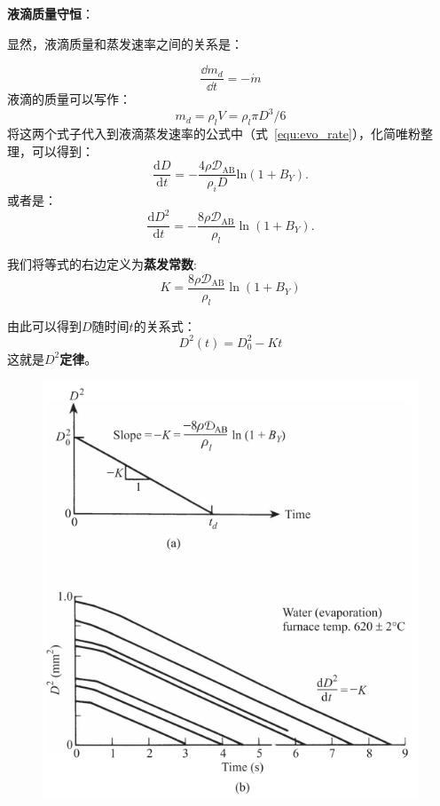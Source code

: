\textbf{液滴质量守恒}：

显然，液滴质量和蒸发速率之间的关系是：

\begin{equation}
    \frac{\dd m_d}{\dd t}=-\dot{m}
\end{equation}
液滴的质量可以写作：
\begin{equation}
    m_d = \rho_l V = \rho_l \pi D^3/6
\end{equation}
将这两个式子代入到液滴蒸发速率的公式中（式~\ref{equ:evo_rate}），化简唯粉整理，可以得到：
\begin{equation}
    \frac{\mathrm{d}D}{\mathrm{d}t}=-\frac{4\rho \mathcal{D}_\mathrm{AB}}{\rho_{i}D}\mathrm{ln}(1+B_{Y}).
\end{equation}
或者是：
\begin{equation}\label{equ:03_evap}
    {\frac{\mathrm{d}D^{2}}{\mathrm{d}t}}=-{\frac{8\rho \mathcal{D}_{\mathrm{AB}}}{\rho_{l}}}\ln(1+B_{Y}).
\end{equation}

我们将等式的右边定义为\textbf{蒸发常数}:
\begin{equation}
    K = {\frac{8\rho \mathcal{D}_{\mathrm{AB}}}{\rho_{l}}}\ln(1+B_{Y})
\end{equation}

由此可以得到\(D\)随时间\(t\)的关系式：
\begin{equation}
    D^2(t)=D_0^2 - Kt
\end{equation}
这就是\textbf{\(D^2\)定律}。

\begin{figure}[H]
    \centering
    \includegraphics[width=.3\textwidth]{img/d2.png}
\end{figure}
